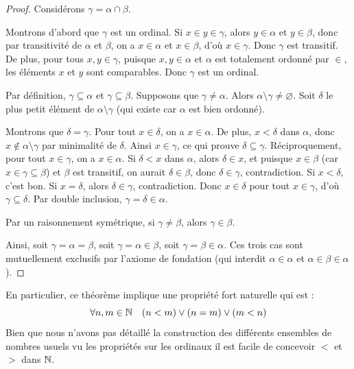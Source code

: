 \begin{proof}
	Considérons $\gamma = \alpha \cap \beta$.

	Montrons d'abord que $\gamma$ est un ordinal. Si $x \in y \in \gamma$, alors $y \in \alpha$ et $y \in \beta$, donc par transitivité de $\alpha$ et $\beta$, on a $x \in \alpha$ et $x \in \beta$, d'où $x \in \gamma$. Donc $\gamma$ est transitif. De plus, pour tous $x, y \in \gamma$, puisque $x, y \in \alpha$ et $\alpha$ est totalement ordonné par $\in$, les éléments $x$ et $y$ sont comparables. Donc $\gamma$ est un ordinal.

	Par définition, $\gamma \subseteq \alpha$ et $\gamma \subseteq \beta$. Supposons que $\gamma \neq \alpha$. Alors $\alpha \setminus \gamma \neq \varnothing$. Soit $\delta$ le plus petit élément de $\alpha \setminus \gamma$ (qui existe car $\alpha$ est bien ordonné).

	Montrons que $\delta = \gamma$. Pour tout $x \in \delta$, on a $x \in \alpha$. De plus, $x < \delta$ dans $\alpha$, donc $x \notin \alpha \setminus \gamma$ par minimalité de $\delta$. Ainsi $x \in \gamma$, ce qui prouve $\delta \subseteq \gamma$. Réciproquement, pour tout $x \in \gamma$, on a $x \in \alpha$. Si $\delta < x$ dans $\alpha$, alors $\delta \in x$, et puisque $x \in \beta$ (car $x \in \gamma \subseteq \beta$) et $\beta$ est transitif, on aurait $\delta \in \beta$, donc $\delta \in \gamma$, contradiction. Si $x < \delta$, c'est bon. Si $x = \delta$, alors $\delta \in \gamma$, contradiction. Donc $x \in \delta$ pour tout $x \in \gamma$, d'où $\gamma \subseteq \delta$. Par double inclusion, $\gamma = \delta \in \alpha$.

	Par un raisonnement symétrique, si $\gamma \neq \beta$, alors $\gamma \in \beta$.

	Ainsi, soit $\gamma = \alpha = \beta$, soit $\gamma = \alpha \in \beta$, soit $\gamma = \beta \in \alpha$. Ces trois cas sont mutuellement exclusifs par l'axiome de fondation (qui interdit $\alpha \in \alpha$ et $\alpha \in \beta \in \alpha$).
\end{proof}

\begin{remarque}
    En particulier, ce théorème implique une propriété fort naturelle qui est :
    \[
    \forall n,m \in \mathbb{N} \quad (n<m) \lor (n=m) \lor (m<n)
    \]
    Bien que nous n'avons pas détaillé la construction des différents ensembles de nombres usuels vu les propriétés sur les ordinaux il est facile de concevoir $<$ et $>$ dans $\mathbb{N}$.
\end{remarque}

